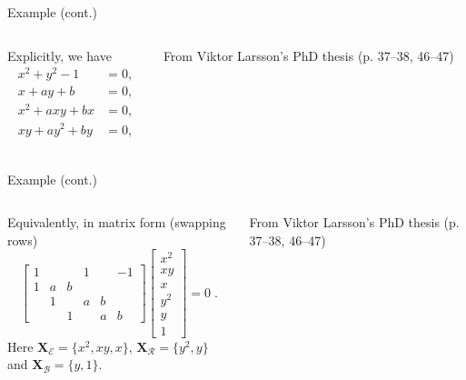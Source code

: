 \documentclass[aspectratio=169]{beamer}
\newcommand{\mat}[1]{\bm{#1}}
\newcommand{\XE}{\ensuremath{\mat{X}_\mathcal{E}}}
\newcommand{\XR}{\ensuremath{\mat{X}_\mathcal{R}}}
\newcommand{\XB}{\ensuremath{\mat{X}_\mathcal{B}}}
\begin{document}
\begin{frame}[t]{Example (cont.)}
\vspace{1cm}
\begin{columns}
    \begin{column}{0.7\textwidth}
        Explicitly, we have
        \begin{equation*}
            \begin{aligned}
            x^2 + y^2 -1 & = 0, \\
            x+ay+b & = 0, \\
            x^2+axy+bx & = 0, \\
            xy+ay^2 +by & = 0, \\
            \end{aligned}
        \end{equation*}
    \end{column}%
    \begin{column}{0.3\textwidth}
        \centering
        

        \vspace{5mm}

        {\scriptsize From Viktor Larsson's PhD thesis (p. 37--38, 46--47)}
    \end{column}
\end{columns}
\end{frame}

\begin{frame}[t]{Example (cont.)}
\vspace{1cm}
\begin{columns}
    \begin{column}{0.7\textwidth}
        Equivalently, in matrix form (swapping rows)
        \begin{equation*}
            \begin{bmatrix}
                1 &&&1&&-1 \\
                1&a&b\\
                &1&&a&b\\
                &&1&&a&b
            \end{bmatrix}
            \begin{bmatrix}
                x^2 \\ xy \\ x \\ y^2 \\ y \\ 1
            \end{bmatrix}
            = 0\;.
        \end{equation*}
    Here $\XE = \{x^2,xy,x\}$, $\XR=\{y^2,y\}$ and $\XB=\{y,1\}$.
    \end{column}%
    \begin{column}{0.3\textwidth}
        \centering
        

        \vspace{5mm}

        {\scriptsize From Viktor Larsson's PhD thesis (p. 37--38, 46--47)}
    \end{column}
\end{columns}
\end{frame}
\end{document}
